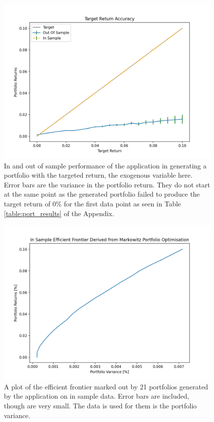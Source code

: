 \documentclass{article}
\begin{document}
\begin{figure}[H]
	\centerline{\includegraphics[width=\textwidth]{figures/oos_accuracy.png}}
	\caption{In and out of sample performance of the application in generating a portfolio with the targeted return, the exogenous variable here. Error bars are the variance in the portfolio return. They do not start at the same point as the generated portfolio failed to produce the target return of 0\% for the first data point as seen in Table \ref{table:port_results} of the Appendix.}
	\label{fig:oos_accuracy}
\end{figure}





\begin{figure}[H]
	\centerline{\includegraphics[width=\textwidth]{figures/is_ef.png}}
	\caption{A plot of the efficient frontier marked out by 21 portfolios generated by the application on in sample data. Error bars are included, though are very small. The data is used for them is the portfolio variance.}
	\label{fig:is_ef}
\end{figure}
\end{document}
